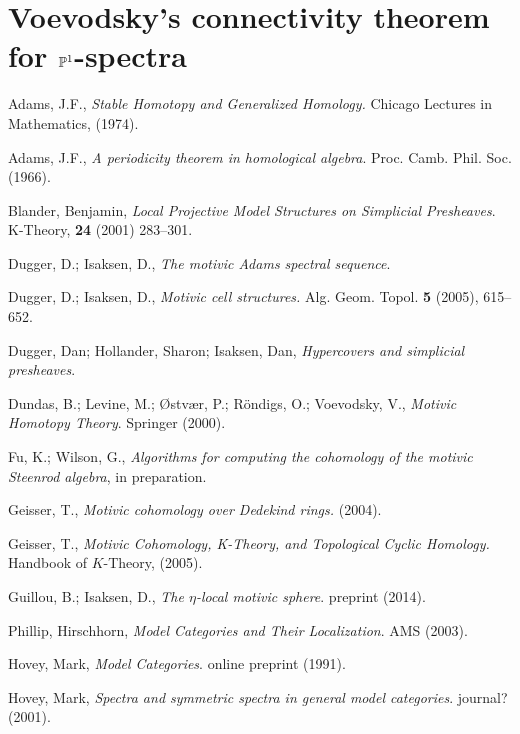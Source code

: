 \documentclass{amsart}%
\begin{document}
\section{Voevodsky's connectivity theorem for $\mathbb{P}^1$-spectra}


\begin{thebibliography}{OOOO}
     Adams, J.F., {\it Stable Homotopy and
    Generalized Homology.} Chicago Lectures in Mathematics, (1974).

     Adams, J.F., {\it A
    periodicity theorem in homological
    algebra}. Proc. Camb. Phil. Soc. (1966).

     Blander, Benjamin, {\it Local Projective
    Model Structures on Simplicial Presheaves}. K-Theory, {\bf 24}
  (2001) 283--301.

     Dugger, D.; Isaksen, D., {\it The motivic Adams
    spectral sequence}.

     Dugger, D.; Isaksen, D., {\it Motivic
    cell structures.} Alg. Geom. Topol. {\bf 5} (2005), 615--652.

     Dugger, Dan; Hollander, Sharon; Isaksen, Dan,
  {\it Hypercovers and simplicial presheaves}.

     Dundas, B.; Levine, M.;
  {\O}stv{\ae}r, P.; R\"ondigs, O.; Voevodsky, V., {\it Motivic
    Homotopy Theory}. Springer (2000).

     Fu, K.; Wilson, G., {\it Algorithms
    for computing the cohomology of the motivic Steenrod algebra}, in
  preparation.

     Geisser, T., {\it Motivic cohomology over
    Dedekind rings.} (2004).

     Geisser, T., {\it Motivic
    Cohomology, K-Theory, and Topological Cyclic Homology.} Handbook
  of $K$-Theory, (2005).

     Guillou, B.; Isaksen, D., {\it The
    $\eta$-local motivic sphere}. preprint (2014).

     Phillip, Hirschhorn, {\it Model Categories
    and Their Localization}. AMS (2003).

     Hovey, Mark, {\it Model Categories}.
  online preprint (1991).
  
     Hovey, Mark, {\it Spectra and symmetric
    spectra in general model categories}. journal? (2001).


\end{thebibliography}
\end{document}
